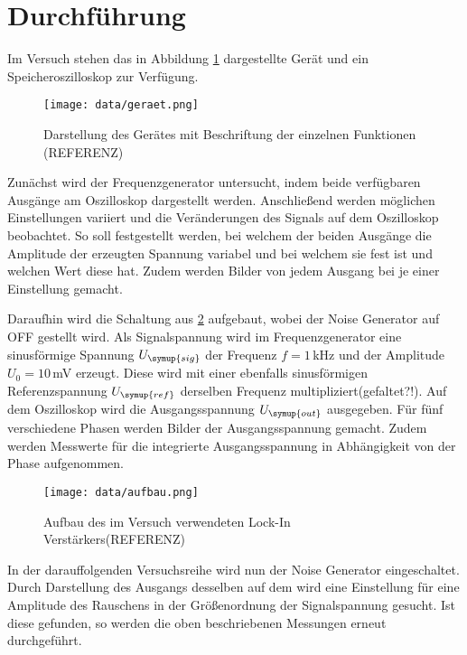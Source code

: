 \section{Durchführung}
\label{sec:Durchführung}
Im Versuch stehen das in Abbildung \ref{fig:geraet} dargestellte Gerät und ein
Speicheroszilloskop zur Verfügung.

\begin{figure}
  \centering
  \texttt{[image: data/geraet.png]}
  \caption{Darstellung des Gerätes mit Beschriftung der einzelnen Funktionen
  (REFERENZ)}
  \label{fig:geraet}
\end{figure}


Zunächst wird der Frequenzgenerator untersucht, indem beide verfügbaren
Ausgänge am Oszilloskop dargestellt werden. Anschließend werden möglichen Einstellungen
variiert und die Veränderungen des Signals auf dem Oszilloskop beobachtet. So soll
festgestellt werden, bei welchem der beiden Ausgänge die Amplitude der erzeugten
Spannung variabel und bei welchem sie fest ist und welchen Wert diese hat. Zudem
werden Bilder von jedem Ausgang bei je einer Einstellung gemacht.

Daraufhin wird die Schaltung aus \ref{fig:aufbau} aufgebaut, wobei der Noise Generator
auf OFF gestellt wird. Als Signalspannung wird im Frequenzgenerator eine sinusförmige Spannung
$U_{\symup{sig}}$ der Frequenz $f=1$\,kHz und der Amplitude $U_0=10$\,mV erzeugt.
Diese wird mit  einer ebenfalls sinusförmigen Referenzspannung $U_{\symup{ref}}$
derselben Frequenz multipliziert(gefaltet?!). Auf dem Oszilloskop wird die Ausgangsspannung
$U_{\symup{out}}$ ausgegeben. Für fünf verschiedene Phasen werden Bilder der
Ausgangsspannung gemacht. Zudem werden Messwerte für die integrierte Ausgangsspannung
in Abhängigkeit von der Phase aufgenommen.

\begin{figure}
  \centering
  \texttt{[image: data/aufbau.png]}
  \caption{Aufbau des im Versuch verwendeten Lock-In Verstärkers(REFERENZ)}
  \label{fig:aufbau}
\end{figure}

In der darauffolgenden Versuchsreihe wird nun der Noise Generator eingeschaltet.
Durch Darstellung des Ausgangs desselben auf dem wird eine Einstellung für eine
Amplitude des Rauschens in der Größenordnung der Signalspannung gesucht. Ist diese
gefunden, so werden die oben beschriebenen Messungen erneut durchgeführt.

